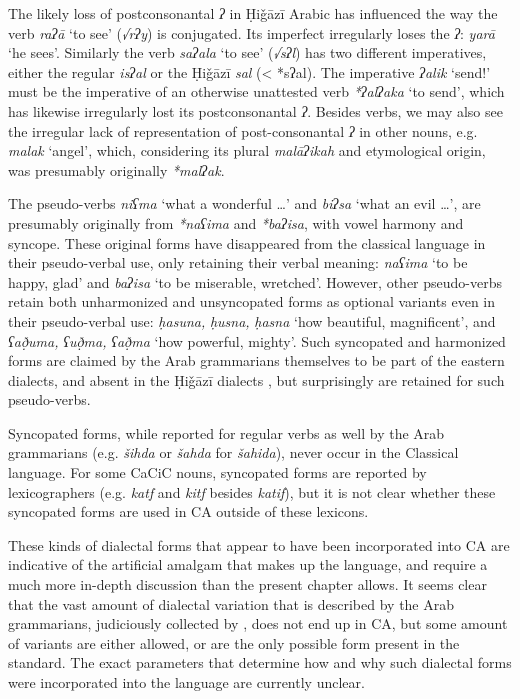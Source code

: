 \documentclass[output=paper]{langsci/langscibook}
\begin{document}
The likely loss of postconsonantal \textit{ʔ} in Ḥiǧāzī Arabic has influenced the way the verb \textit{raʔā} ‘to see’ (\textit{√rʔy}) is conjugated. Its imperfect irregularly loses the \textit{ʔ}: \textit{yarā} ‘he sees’. Similarly the verb \textit{saʔala} ‘to see’ (\textit{√sʔl}) has two different imperatives, either the regular \textit{isʔal} or the Ḥiǧāzī \textit{sal} (< *sʔal). The imperative \textit{ʔalik} ‘send!’ must be the imperative of an otherwise unattested verb \textit{*ʔalʔaka} ‘to send’, which has likewise irregularly lost its postconsonantal \textit{ʔ}. Besides verbs, we may also see the irregular lack of representation of post-consonantal \textit{ʔ} in other nouns, e.g. \textit{malak} ‘angel’, which, considering its plural \textit{malāʔikah} and etymological origin, was presumably originally \textit{*malʔak}.

The pseudo-verbs \textit{niʕma} ‘what a wonderful …’ and \textit{biʔsa} ‘what an evil …’, are presumably originally from \textit{*naʕima} and \textit{*baʔisa}, with vowel harmony and syncope. These original forms have disappeared from the classical language in their pseudo-verbal use, only retaining their verbal meaning: \textit{naʕima} ‘to be happy, glad’ and \textit{baʔisa} ‘to be miserable, wretched’. However, other pseudo-verbs retain both unharmonized and unsyncopated forms as optional variants even in their pseudo-verbal use: \textit{ḥasuna,} \textit{ḥusna,} \textit{ḥasna} ‘how beautiful, magnificent’, and \textit{ʕað̣uma,} \textit{ʕuð̣ma,} \textit{ʕað̣ma} ‘how powerful, mighty’. Such syncopated and harmonized forms are claimed by the Arab grammarians themselves to be part of the eastern dialects, and absent in the Ḥiǧāzī dialects \citep[97]{Rabin1951}, but surprisingly are retained for such pseudo-verbs.

Syncopated forms, while reported for regular verbs as well by the Arab grammarians (e.g. \textit{šihda} or \textit{šahda} for \textit{šahida}), never occur in the Classical language. For some CaCiC nouns, syncopated forms are reported by lexicographers (e.g. \textit{katf} and \textit{kitf} besides \textit{katif}), but it is not clear whether these syncopated forms are used in CA outside of these lexicons.

These kinds of dialectal forms that appear to have been incorporated into CA are indicative of the artificial amalgam that makes up the language, and require a much more in-depth discussion than the present chapter allows. It seems clear that the vast amount of dialectal variation that is described by the Arab grammarians, judiciously collected by \citet{Rabin1951}, does not end up in CA, but some amount of variants are either allowed, or are the only possible form present in the standard. The exact parameters that determine how and why such dialectal forms were incorporated into the language are currently unclear.
\end{document}
